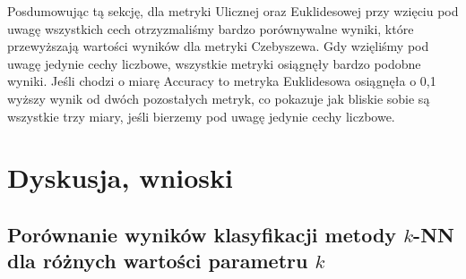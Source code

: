 \documentclass{classrep}
\begin{document}
\indent Posdumowując tą sekcję, dla metryki Ulicznej oraz Euklidesowej przy wzięciu pod uwagę wszystkich cech otrzyzmaliśmy bardzo porównywalne wyniki, które przewyższają wartości wyników dla metryki Czebyszewa. Gdy wzięliśmy pod uwagę jedynie cechy liczbowe, wszystkie metryki osiągnęły bardzo podobne wyniki. Jeśli chodzi o miarę Accuracy to metryka Euklidesowa osiągnęła o 0,1 wyższy wynik od dwóch pozostałych metryk, co pokazuje jak bliskie sobie są wszystkie trzy miary, jeśli bierzemy pod uwagę jedynie cechy liczbowe.


\clearpage
\section{Dyskusja, wnioski}
\subsection{Porównanie wyników klasyfikacji metody $k$-NN dla różnych wartości parametru $k$}
\end{document}
